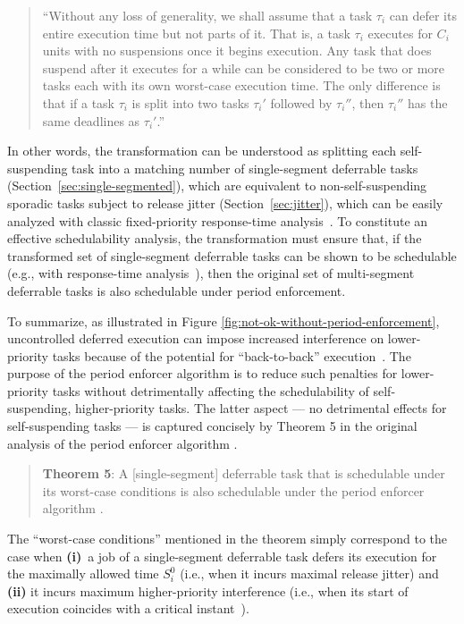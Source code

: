 \begin{quote}
	 ``Without any loss of generality, we shall assume that a task $\tau_i$ can defer its entire execution time but not parts of it. That is, a task $\tau_i$ executes for $C_i$ units with no suspensions once it begins execution. Any task that does suspend after it executes for a while can be considered to be two or more tasks each with its own worst-case execution time. The only difference is that if a task $\tau_i$ is split into two tasks $\tau_i'$ followed by $\tau_i''$, then $\tau_i''$ has the same deadlines as $\tau_i{{'}}$.''
\end{quote}
%
In other words, the transformation can be understood as splitting each self-suspending task into a matching number of single-segment deferrable tasks (Section~\ref{sec:single-segmented}), which are equivalent to non-self-suspending sporadic tasks subject to release jitter (Section~\ref{sec:jitter}), which can be easily analyzed with classic fixed-priority response-time analysis~\cite{ABRTW:93}. To constitute an effective schedulability analysis, the transformation must ensure that, if the transformed set of single-segment deferrable tasks can be shown to be schedulable (e.g., with response-time analysis~\cite{ABRTW:93}), then the original set of multi-segment deferrable tasks is also schedulable under period enforcement.

To summarize, as illustrated in Figure \ref{fig:not-ok-without-period-enforcement},
uncontrolled deferred execution can impose  increased interference on lower-priority tasks because of the potential for ``back-to-back'' execution~\cite{LSS:87,LSST:91,Ra:90,ABRTW:93,SLS:95}. The purpose of the period enforcer algorithm is to reduce such penalties for lower-priority tasks without detrimentally affecting the schedulability of self-suspending, higher-priority tasks. The latter aspect --- no detrimental effects for self-suspending tasks --- is captured concisely by Theorem 5 in the original analysis of the period enforcer algorithm \cite{Raj:suspension1991}.
\begin{quote}
{\bf Theorem 5}: A [single-segment] deferrable task that is schedulable under its worst-case conditions is also schedulable under the period enforcer algorithm \cite{Raj:suspension1991}. 
\end{quote}
The ``worst-case conditions'' mentioned in the theorem simply correspond to the case when \textbf{(i)}~a job of a single-segment deferrable task defers its execution for the maximally allowed time $S_i^0$ (i.e., when it incurs maximal release jitter) and \textbf{(ii)} it incurs maximum higher-priority interference (i.e., when its start of execution coincides with a critical instant~\cite{LL:73}).


